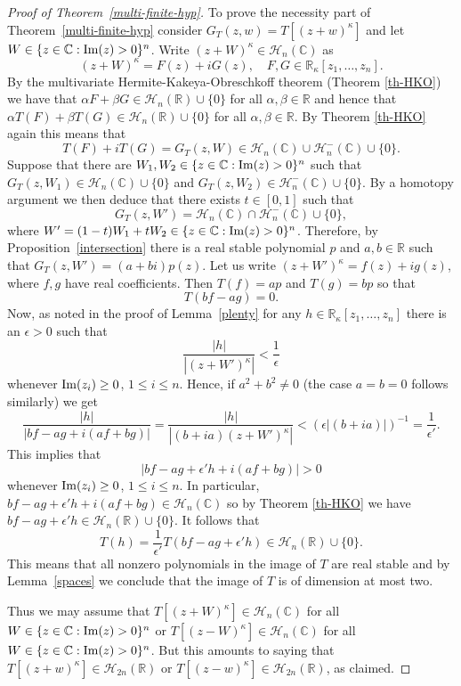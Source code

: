 \documentclass[10pt,reqno]{amsart}
\theoremstyle{plain}
\theoremstyle{definition}
\theoremstyle{remark}
\numberwithin{equation}{section}
\newcommand{\HH}{\mathcal{H}}
\newcommand{\RR}{\mathbb{R}}
\newcommand{\CC}{\mathbb{C}}
\renewcommand{\Im}{{\rm Im}}
\begin{document}
\begin{proof}[Proof of Theorem~\ref{multi-finite-hyp}]
To prove the necessity part of Theorem~\ref{multi-finite-hyp} consider 
$G_T(z,w)=T[(z+w)^\kappa]$ and let $W \in \{z \in \CC: \Im(z)>0\}^n$. 
Write $(z+W)^\kappa \in \HH_n(\CC)$ as 
$$
(z+W)^\kappa = F(z)+iG(z),  \quad F,G \in \RR_\kappa[z_1,\ldots, z_n].  
$$
By the multivariate 
Hermite-Kakeya-Obreschkoff theorem (Theorem \ref{th-HKO})
we have that $\alpha F + \beta G \in \HH_n(\RR)\cup\{0\}$ for all 
$\alpha, \beta \in \RR$ and hence that  
$\alpha T(F)+ \beta T(G) \in \HH_n(\RR)\cup\{0\}$ for all 
$\alpha, \beta \in \RR$. By Theorem \ref{th-HKO} again this means that 
$$
T(F)+iT(G)=G_T(z,W) \in \HH_n(\CC)\cup \HH_n^{-}(\CC) \cup \{0\}. 
$$ 
Suppose that there are $W_1, W_2  \in \{z \in \CC: \Im(z)>0\}^n$ such that 
$G_T(z,W_1) \in \HH_n(\CC) \cup \{0\}$ and 
$G_T(z,W_2) \in \HH_n^{-}(\CC) \cup \{0\}$. By a homotopy argument we then
deduce that there exists $t\in[0,1]$ such that
$$
G_T(z,W')=\HH_n(\CC)\cap \HH_n^{-}(\CC) \cup \{0\},$$
where $W'=(1-t)W_1+tW_2 \in \{z \in \CC: \Im(z)>0\}^n$. Therefore, 
by Proposition~\ref{intersection} there is a real stable polynomial $p$ and 
$a,b \in \RR$ such that 
$G_T(z,W')=(a+bi)p(z)$. Let us write $(z+W')^\kappa= f(z)+ig(z)$, 
where $f,g$ have real coefficients. 
Then $T(f)=ap$ and $T(g)=bp$ so that 
$$
T(bf-ag)=0. 
$$
Now, as noted in the proof of Lemma~\ref{plenty} for any 
$h \in \RR_\kappa[z_1,\ldots,z_n]$ there is an $\epsilon >0$ such that 
$$
\frac {|h|}{|(z+W')^\kappa|} < \frac{1}{\epsilon}
$$
whenever $\Im(z_i) \geq 0$, $1\le i\le n$. 
Hence, if $a^2+b^2 \neq 0$ (the case $a=b=0$ follows similarly) we get 
$$
\frac {|h|}{|bf-ag+i(af+bg)|} = \frac {|h|}{|(b+ia)(z+W')^\kappa|} 
< (\epsilon|(b+ia)|)^{-1}=\frac{1}{\epsilon'}.
$$
This implies that 
$$
|bf-ag+\epsilon'h+i(af+bg)| > 0
$$
whenever $\Im(z_i) \geq 0$, $1\le i\le n$. In particular, 
$bf-ag+\epsilon'h+i(af+bg) \in \HH_n(\CC)$ so by Theorem \ref{th-HKO}
we have 
$bf-ag+\epsilon'h \in \HH_n(\RR) \cup \{0\}$. It follows that 
$$
T(h)=\frac 1 {\epsilon'}T(bf-ag+\epsilon'h) \in \HH_n(\RR)\cup\{0\}.
$$
This means that all nonzero polynomials in the image of $T$ are real stable 
and by Lemma~\ref{spaces} we conclude that the image of $T$ is of 
dimension at most two. 

Thus we may assume that $T[(z+W)^\kappa] \in \HH_n(\CC)$ for all 
$W \in \{z \in \CC: \Im(z)>0\}^n$ or 
$T[(z-W)^\kappa] \in \HH_n(\CC)$ for all $W \in \{z \in \CC: \Im(z)>0\}^n$. 
But this amounts to saying that 
$T[(z+w)^\kappa] \in \HH_{2n}(\RR)$ or $T[(z-w)^\kappa] \in \HH_{2n}(\RR)$, 
as claimed. 
\end{proof}
\end{document}
